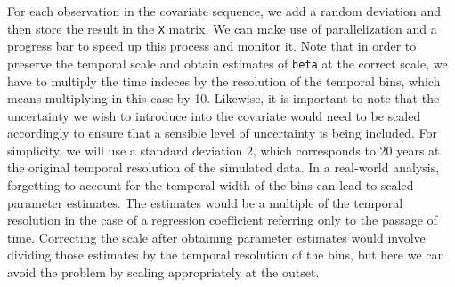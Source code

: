 \documentclass[]{article}
\begin{document}
For each observation in the covariate sequence, we add a random
deviation and then store the result in the \texttt{X} matrix. We can
make use of parallelization and a progress bar to speed up this process
and monitor it. Note that in order to preserve the temporal scale and
obtain estimates of \texttt{beta} at the correct scale, we have to
multiply the time indeces by the resolution of the temporal bins, which
means multiplying in this case by 10. Likewise, it is important to note
that the uncertainty we wish to introduce into the covariate would need
to be scaled accordingly to ensure that a sensible level of uncertainty
is being included. For simplicity, we will use a standard deviation 2,
which corresponds to 20 years at the original temporal resolution of the
simulated data. In a real-world analysis, forgetting to account for the
temporal width of the bins can lead to scaled parameter estimates. The
estimates would be a multiple of the temporal resolution in the case of
a regression coefficient referring only to the passage of time.
Correcting the scale after obtaining parameter estimates would involve
dividing those estimates by the temporal resolution of the bins, but
here we can avoid the problem by scaling appropriately at the outset.
\end{document}
